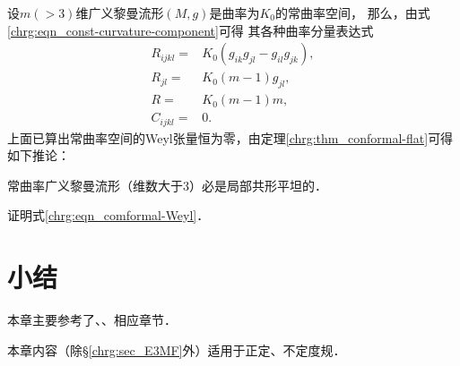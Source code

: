 设$m(>3)$维广义黎曼流形$(M,g)$是曲率为$K_0$的常曲率空间，
那么，由式\eqref{chrg:eqn_const-curvature-component}可得
其各种曲率分量表达式
\begin{align}
    R_{ijkl}=&  K_0 ( g_{ik}g_{jl}- g_{il}g_{jk}  ), \\
    R_{jl}=&  K_0 ( m - 1  ) g_{jl}, \\
    R=& K_0 ( m - 1  ) m , \\
    C_{ijkl}=& 0 .
\end{align}
上面已算出常曲率空间的Weyl张量恒为零，由定理\ref{chrg:thm_conformal-flat}可得如下推论：
\begin{corollary}\label{chrg:thm_conformal-flat-const-curvature}
    常曲率广义黎曼流形（维数大于3）必是局部共形平坦的．
\end{corollary}




\begin{exercise}
	证明式\eqref{chrg:eqn_comformal-Weyl}．
\end{exercise}


\section*{小结}
本章主要参考了\parencite{oneill1983}、\parencite{cc2001-zh}、\parencite{chen-li-2023-2ed-v1}相应章节．

本章内容（除\S\ref{chrg:sec_E3MF}外）适用于正定、不定度规．


\printbibliography[heading=subbibliography,title=第\ref{chrg}章参考文献]

\endinput
